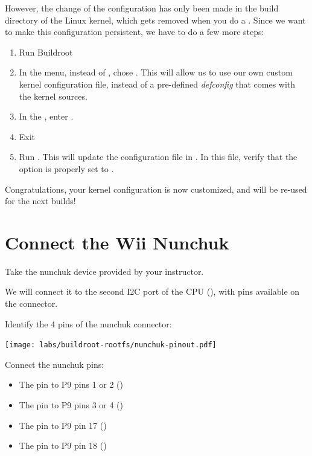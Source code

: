 However, the change of the configuration has only been made in the
build directory of the Linux kernel, which gets removed when you do a
. Since we want to make this configuration
persistent, we have to do a few more steps:

\begin{enumerate}

\item Run Buildroot 

\item In the  menu, instead of ,
  chose . This will allow us to use
  our own custom kernel configuration file, instead of a pre-defined
  {\em defconfig} that comes with the kernel sources.

\item In the , enter
  .

\item Exit 

\item Run . This will update the
  configuration file in
  . In this file,
  verify that the option  is properly
  set to .

\end{enumerate}

Congratulations, your kernel configuration is now customized, and will
be re-used for the next builds!

\section{Connect the Wii Nunchuk}

Take the nunchuk device provided by your instructor.

We will connect it to the second I2C port of the CPU (),
with pins available on the  connector.

Identify the 4 pins of the nunchuk connector:

\begin{center}
\texttt{[image: labs/buildroot-rootfs/nunchuk-pinout.pdf]}
\end{center}

Connect the nunchuk pins:
\begin{itemize}
\item The  pin to P9 pins 1 or 2 ()
\item The  pin to P9 pins 3 or 4 ()
\item The  pin to P9 pin 17 ()
\item The  pin to P9 pin 18 ()
\end{itemize}

